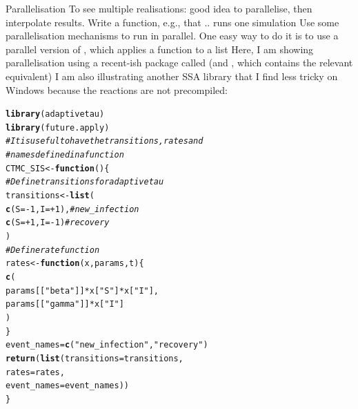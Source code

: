 \documentclass[aspectratio=169]{beamer}\usepackage[]{graphicx}\usepackage[]{xcolor}
\newcommand{\hlnum}[1]{\textcolor[rgb]{0.686,0.059,0.569}{#1}}%
\newcommand{\hlsng}[1]{\textcolor[rgb]{0.192,0.494,0.8}{#1}}%
\newcommand{\hlcom}[1]{\textcolor[rgb]{0.678,0.584,0.686}{\textit{#1}}}%
\newcommand{\hlopt}[1]{\textcolor[rgb]{0,0,0}{#1}}%
\newcommand{\hldef}[1]{\textcolor[rgb]{0.345,0.345,0.345}{#1}}%
\newcommand{\hlkwa}[1]{\textcolor[rgb]{0.161,0.373,0.58}{\textbf{#1}}}%
\newcommand{\hlkwb}[1]{\textcolor[rgb]{0.69,0.353,0.396}{#1}}%
\newcommand{\hlkwc}[1]{\textcolor[rgb]{0.333,0.667,0.333}{#1}}%
\newcommand{\hlkwd}[1]{\textcolor[rgb]{0.737,0.353,0.396}{\textbf{#1}}}%
\newenvironment{knitrout}{}{} %
\begin{document}
\begin{frame}{Parallelisation}
    To see multiple realisations: good idea to parallelise, then interpolate results. Write a function, e.g.,   that .. runs one simulation
    \vfill
    Use some parallelisation mechanisms to run  in parallel. One easy way to do it is to use a parallel version of , which applies a function to a list
    \vfill
    Here, I am showing parallelisation using a recent-ish package called  (and , which contains the relevant  equivalent)
    \vfill
    I am also illustrating another SSA library that I find less tricky on Windows because the reactions are not precompiled: 
\end{frame}

\begin{knitrout}
\color{fgcolor}
\begin{alltt}
\hlkwd{library}\hldef{(adaptivetau)}
\hlkwd{library}\hldef{(future.apply)}
\hlcom{# It is useful to have the transitions, rates and }
\hlcom{# names defined in a function}
\hldef{CTMC_SIS} \hlkwb{<-} \hlkwa{function}\hldef{() \{}
  \hlcom{# Define transitions for adaptivetau}
  \hldef{transitions} \hlkwb{<-} \hlkwd{list}\hldef{(}
    \hlkwd{c}\hldef{(}\hlkwc{S} \hldef{=} \hlopt{-}\hlnum{1}\hldef{,} \hlkwc{I} \hldef{=} \hlopt{+}\hlnum{1}\hldef{),}  \hlcom{# new_infection}
    \hlkwd{c}\hldef{(}\hlkwc{S} \hldef{=} \hlopt{+}\hlnum{1}\hldef{,} \hlkwc{I} \hldef{=} \hlopt{-}\hlnum{1}\hldef{)}   \hlcom{# recovery}
  \hldef{)}
  \hlcom{# Define rate function}
  \hldef{rates} \hlkwb{<-} \hlkwa{function}\hldef{(}\hlkwc{x}\hldef{,} \hlkwc{params}\hldef{,} \hlkwc{t}\hldef{) \{}
    \hlkwd{c}\hldef{(}
      \hldef{params[[}\hlsng{"beta"}\hldef{]]} \hlopt{*} \hldef{x[}\hlsng{"S"}\hldef{]} \hlopt{*} \hldef{x[}\hlsng{"I"}\hldef{],}
      \hldef{params[[}\hlsng{"gamma"}\hldef{]]} \hlopt{*} \hldef{x[}\hlsng{"I"}\hldef{]}
    \hldef{)}
  \hldef{\}}
  \hldef{event_names} \hlkwb{=} \hlkwd{c}\hldef{(}\hlsng{"new_infection"}\hldef{,} \hlsng{"recovery"}\hldef{)}
  \hlkwd{return}\hldef{(}\hlkwd{list}\hldef{(}\hlkwc{transitions} \hldef{= transitions,}
              \hlkwc{rates} \hldef{= rates,}
              \hlkwc{event_names} \hldef{= event_names))}
\hldef{\}}


\end{alltt}
\end{knitrout}
\end{document}
